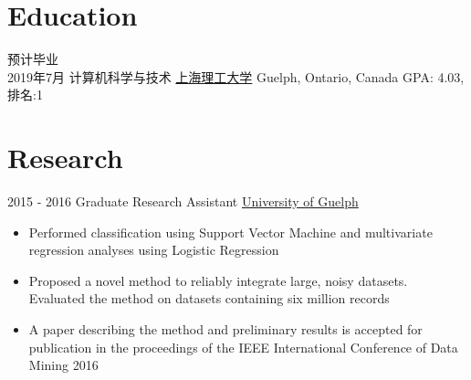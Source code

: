 \documentclass[letterpaper,UTF8]{twentysecondcv} %
\begin{document}
\makeprofile %

\section{Education}

\begin{twenty} %
	\twentyitem
    	{预计毕业 \\ 2019年7月}
        {计算机科学与技术}
        {\href{http://www.usst.edu.cn/}{上海理工大学}}
        {Guelph, Ontario, Canada}
        {GPA: 4.03, 排名:1}
\end{twenty}


\section{Research}
\begin{twenty}
	\twentyitem
    	{2015 - 2016}
        {Graduate Research Assistant}
        {\href{http://www.uoguelph.ca/}{University of Guelph}}
        {}
        {
        {\begin{itemize}
        \item Performed classification using Support Vector Machine and multivariate regression analyses using Logistic Regression
        \item Proposed a novel method to reliably integrate large, noisy datasets. Evaluated the method on datasets containing six million records
        \item A paper describing the method and preliminary results is accepted for publication in the proceedings of the IEEE International Conference of Data Mining 2016
    \end{itemize}}
        }
\end{twenty}

\end{document}

